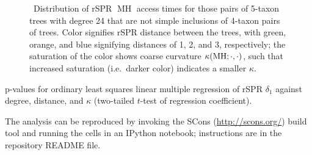 \documentclass[11pt]{amsart}
\let\MYoriglatexcaption\caption
\renewcommand{\caption}[2][\relax]{\MYoriglatexcaption[#2]{#2}}
\newcommand{\MH}{\operatorname{MH}}
\newcommand{\curvature}[2][]{%
    \ifthenelse{\equal{#1}{}}%
		{\kappa(#2)}%
		{\kappa_{#1}(#2)}%
}
\begin{document}
\begin{figure}
    \caption{\
        Distribution of rSPR $\MH$ access times for those pairs of 5-taxon trees with degree 24 that are not simple inclusions of 4-taxon pairs of trees.
        Color signifies rSPR distance between the trees, with green, orange, and blue signifying distances of 1, 2, and 3, respectively; the saturation of the color shows coarse curvature $\curvature{\MH; \cdot, \cdot}$, such that increased saturation (i.e.\ darker color) indicates a smaller $\kappa$.
        }
	\label{fig:kappa-access}
\end{figure}


\begin{table}
\centering
\caption{p-values for ordinary least squares linear multiple regression of rSPR $\delta_1$ against degree, distance, and $\kappa$ (two-tailed $t$-test of regression coefficient).}
\csvautotabular{tables/delta1.csv}
\label{tab:regressionDelta}
\end{table}

The analysis can be reproduced by invoking the SCons (\url{http://scons.org/}) build tool and running the cells in an IPython notebook; instructions are in the repository README file.
\end{document}
